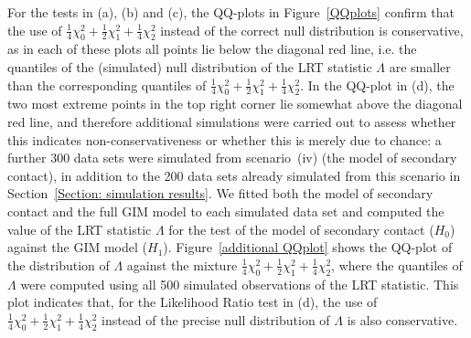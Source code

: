 \documentclass[11pt]{article}
\begin{document}
{For the tests in (a), (b) and (c), the QQ-plots in Figure~\ref{QQplots} confirm that the use of $\frac{1}{4} \chi^2_0 +\frac{1}{2} \chi^2_1 +\frac{1}{4} \chi^2_2$ instead of the correct null distribution is conservative, as in each of these plots all points lie below the diagonal red line, i.e. the quantiles of the (simulated) null distribution of the LRT statistic $\Lambda$ are smaller than the corresponding quantiles of $\frac{1}{4} \chi^2_0 +\frac{1}{2} \chi^2_1 +\frac{1}{4} \chi^2_2$. 
In the QQ-plot in (d),
the two most extreme points in the top right corner lie somewhat above the diagonal red line, and therefore additional simulations were carried out to assess whether this indicates non-conservativeness or whether this is merely due to chance:}
a further 300 data sets were simulated from scenario~(iv) (the model of secondary contact), in addition to the 200 data sets already simulated from this scenario in Section~\ref{Section: simulation results}. We fitted both the model of secondary contact and the full GIM model to each simulated data set and computed the value of the LRT statistic $\Lambda$ for the test of the model of secondary contact ($H_0$) against the GIM model ($H_1$). Figure~\ref{additional QQplot} shows the QQ-plot of the distribution of $\Lambda$ against the mixture $\frac{1}{4} \chi^2_0 +\frac{1}{2} \chi^2_1 +\frac{1}{4} \chi^2_2$, where the quantiles of $\Lambda$ were computed using all 500 simulated observations of the LRT statistic.
This plot indicates that, for the Likelihood Ratio test in {\color{red} (d)}, the use of $\frac{1}{4} \chi^2_0 +\frac{1}{2} \chi^2_1 +\frac{1}{4} \chi^2_2$ instead of the precise null distribution of $\Lambda$ is {\color{red} also} conservative.
\end{document}
